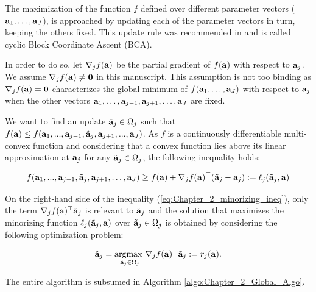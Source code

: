 \documentclass[
]{jss}
\begin{document}
The maximization of the function \(f\) defined over different parameter
vectors (\(\mathbf{a}_1, \ldots,\mathbf{a}_J\)), is approached by updating each of
the parameter vectors in turn, keeping the others fixed. This update
rule was recommended in \citep{DeLeeuw1994} and is called cyclic Block
Coordinate Ascent (BCA).

In order to do so, let \(\nabla_j f(\mathbf{a})\) be the partial gradient of
\(f(\mathbf{a})\) with respect to \(\mathbf{a}_j\). We assume
\(\nabla_j f(\mathbf{a}) \neq \mathbf{0}\) in this manuscript. This
assumption is not too binding as \(\nabla_j f(\mathbf{a}) = \mathbf{0}\)
characterizes the global minimum of \(f(\mathbf{a}_1 , \ldots , \mathbf{a}_J )\)
with respect to \(\mathbf{a}_j\) when the other vectors
\(\mathbf{a}_1 , \ldots , \mathbf{a}_{j-1} , \mathbf{a}_{j+1} , \ldots , \mathbf{a}_J\) are
fixed.

We want to find an update \(\hat{\mathbf{a}}_j\in \Omega_j\) such that
\(f(\mathbf{a})\leq f(\mathbf{a}_1, ..., \mathbf{a}_{j-1}, \hat{\mathbf{a}}_j, \mathbf{a}_{j+1}, ..., \mathbf{a}_J)\).
As \(f\) is a continuously differentiable multi-convex function and
considering that a convex function lies above its linear approximation
at \(\mathbf{a}_j\) for any \(\tilde{\mathbf{a}}_j\in\Omega_j\), the following
inequality holds:

\begin{equation}
\begin{gathered}
f(\mathbf{a}_1, ..., \mathbf{a}_{j-1}, \tilde{\mathbf{a}}_j, \mathbf{a}_{j+1}, \ldots, \mathbf{a}_J) \geq f(\mathbf{a}) + \nabla_jf(\mathbf{a})^\top(\tilde{\mathbf{a}}_j - \mathbf{a}_j) := \ell_j(\tilde{\mathbf{a}}_j, \mathbf{a})
\label{eq:Chapter_2_minorizing_ineq}
\end{gathered}
\end{equation}

On the right-hand side of the inequality
(\ref{eq:Chapter_2_minorizing_ineq}), only the term
\(\nabla_jf(\mathbf{a})^\top\tilde{\mathbf{a}}_j\) is relevant to
\(\tilde{\mathbf{a}}_j\) and the solution that maximizes the minorizing
function \(\ell_j(\tilde{\mathbf{a}}_j, \mathbf{a})\) over
\(\tilde{\mathbf{a}}_j\in\Omega_j\) is obtained by considering the following
optimization problem:

\begin{equation}
\hat{\mathbf{a}}_j = \underset{\tilde{\mathbf{a}}_j\in\Omega_j}{\mathrm{argmax~}} \nabla_j f(\mathbf{a})^\top \tilde{\mathbf{a}}_j := r_j(\mathbf{a}).
\label{eq:Chapter_2_core_updtae}
\end{equation}

The entire algorithm is subsumed in Algorithm
\ref{algo:Chapter_2_Global_Algo}.
\end{document}
